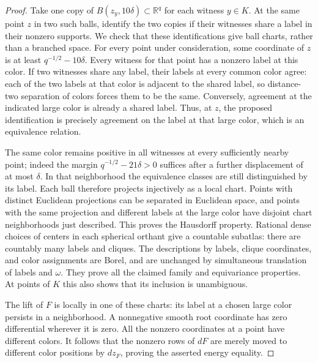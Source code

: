 \begin{proof}
Take one copy of \(B(z_y,10\delta)\subset\mathbb R^q\) for each witness
\(y\in K\).  At the same point \(z\) in two such balls, identify the two
copies if their witnesses share a label in their nonzero supports.  We
check that these identifications give ball charts, rather than a branched
space.  For every point under consideration, some coordinate of \(z\)
is at least \(q^{-1/2}-10\delta\).  Every witness for that point has a
nonzero label at this color.  If two witnesses share any label, their
labels at every common color agree: each of the two labels at that color
is adjacent to the shared label, so distance-two separation of colors
forces them to be the same.  Conversely, agreement at the indicated
large color is already a shared label.  Thus, at \(z\), the proposed
identification is precisely agreement on the label at that large color,
which is an equivalence relation.

The same color remains positive in all witnesses at every sufficiently
nearby point; indeed the margin \(q^{-1/2}-21\delta>0\) suffices after
a further displacement of at most \(\delta\).  In that neighborhood
the equivalence classes are still distinguished by its label.  Each ball
therefore projects injectively as a local chart.  Points with distinct
Euclidean projections can be separated in Euclidean space, and points
with the same projection and different labels at the large color have
disjoint chart neighborhoods just described.  This proves the Hausdorff
property.  Rational dense choices of centers in each spherical orthant
give a countable subatlas: there are countably many labels and cliques.
The descriptions by labels, clique coordinates, and color assignments
are Borel, and are unchanged by simultaneous translation of labels and
\(\omega\).  They prove all the claimed family and equivariance
properties.  At points of \(K\) this also shows that its inclusion is
unambiguous.

The lift of \(F\) is locally in one of these charts: its label at a
chosen large color persists in a neighborhood.  A nonnegative smooth
root coordinate has zero differential wherever it is zero.  All the
nonzero coordinates at a point have different colors.  It follows that
the nonzero rows of \(dF\) are merely moved to different color positions
by \(dz_F\), proving the asserted energy equality.


\end{proof}
